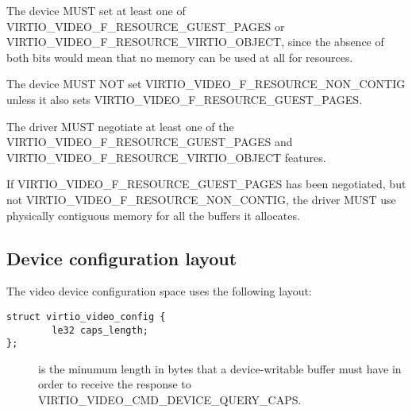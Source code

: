 
The device MUST set at least one of
VIRTIO\_VIDEO\_F\_RESOURCE\_GUEST\_PAGES or
VIRTIO\_VIDEO\_F\_RESOURCE\_VIRTIO\_OBJECT, since the absence of both
bits would mean that no memory can be used at all for resources.

The device MUST NOT set VIRTIO\_VIDEO\_F\_RESOURCE\_NON\_CONTIG unless
it also sets VIRTIO\_VIDEO\_F\_RESOURCE\_GUEST\_PAGES.


The driver MUST negotiate at least one of the
VIRTIO\_VIDEO\_F\_RESOURCE\_GUEST\_PAGES and
VIRTIO\_VIDEO\_F\_RESOURCE\_VIRTIO\_OBJECT features.

If VIRTIO\_VIDEO\_F\_RESOURCE\_GUEST\_PAGES has been negotiated, but not
VIRTIO\_VIDEO\_F\_RESOURCE\_NON\_CONTIG, the driver MUST use physically
contiguous memory for all the buffers it allocates.

\subsection{Device configuration layout}\label{sec:Device Types / Video Device / Device configuration layout}

The video device configuration space uses the following layout:

\begin{lstlisting}
struct virtio_video_config {
        le32 caps_length;
};
\end{lstlisting}

\begin{description}
\item[]
is the minumum length in bytes that a device-writable buffer must have
in order to receive the response to
VIRTIO\_VIDEO\_CMD\_DEVICE\_QUERY\_CAPS.
\end{description}


